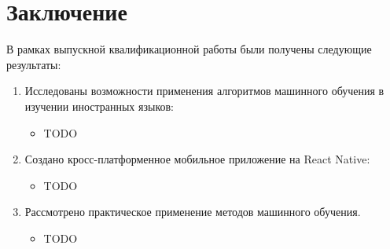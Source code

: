 \section*{Заключение}
В рамках выпускной квалификационной работы были получены следующие результаты:

\begin{enumerate}[1)]
	\item  Исследованы возможности применения алгоритмов машинного обучения в изучении иностранных языков:
	\begin{itemize}
		\item {\color{red} TODO}
	\end{itemize}
	\item Создано кросс-платформенное мобильное приложение на React Native:
	\begin{itemize}
		\item {\color{red} TODO}
	\end{itemize}
	\item Рассмотрено практическое применение методов машинного обучения.
	\begin{itemize}
		\item {\color{red} TODO}
	\end{itemize}
\end{enumerate}

